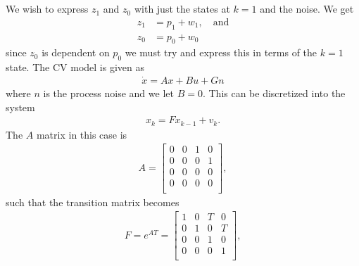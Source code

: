 \documentclass[]{article}
\begin{document}
\section{}
\subsection{}
We wish to express $z_1$ and $z_0$ with just the states at $k=1$ and the noise. We get
\begin{equation}\begin{aligned}
z_1 &= p_1 + w_1, \quad \text{and} \\
z_0 &= p_0 + w_0
\end{aligned}\end{equation}
since $z_0$ is dependent on $p_0$ we must try and express this in terms of the $k=1$ state. The CV model is given as
\begin{equation}\begin{aligned}
\dot x = Ax + Bu + Gn
\end{aligned}\end{equation}
where $n$ is the process noise and we let $B=0$. This can be discretized into the system
\begin{equation}\begin{aligned}
x_k = Fx_{k-1} + v_k.
\end{aligned}\end{equation}
The $A$ matrix in this case is
\begin{equation}\begin{aligned}
A =
\begin{bmatrix}
0 & 0 & 1 & 0 \\
0 & 0 & 0 & 1 \\
0 & 0 & 0 & 0 \\
0 & 0 & 0 & 0 \\
\end{bmatrix},
\end{aligned}\end{equation}
such that the transition matrix becomes
\begin{equation}\begin{aligned}
F = e^{AT} =
\begin{bmatrix}
1 & 0 & T & 0 \\
0 & 1 & 0 & T \\
0 & 0 & 1 & 0 \\
0 & 0 & 0 & 1 \\
\end{bmatrix},
\end{aligned}\end{equation}
\end{document}
